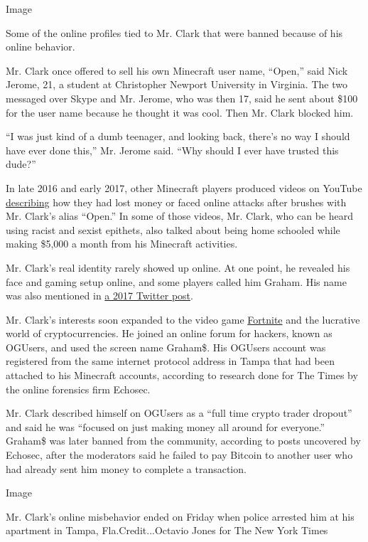 Image

Some of the online profiles tied to Mr. Clark that were banned because
of his online behavior.

Mr. Clark once offered to sell his own Minecraft user name, ``Open,''
said Nick Jerome, 21, a student at Christopher Newport University in
Virginia. The two messaged over Skype and Mr. Jerome, who was then 17,
said he sent about \$100 for the user name because he thought it was
cool. Then Mr. Clark blocked him.

``I was just kind of a dumb teenager, and looking back, there's no way I
should have ever done this,'' Mr. Jerome said. ``Why should I ever have
trusted this dude?''

In late 2016 and early 2017, other Minecraft players produced videos on
YouTube \href{https://www.youtube.com/watch?v=CvrPXbk-BXw}{describing}
how they had lost money or faced online attacks after brushes with Mr.
Clark's alias ``Open.'' In some of those videos, Mr. Clark, who can be
heard using racist and sexist epithets, also talked about being home
schooled while making \$5,000 a month from his Minecraft activities.

Mr. Clark's real identity rarely showed up online. At one point, he
revealed his face and gaming setup online, and some players called him
Graham. His name was also mentioned in
\href{https://twitter.com/opengrahamclark/status/848014008632344576}{a
2017 Twitter post}.

Mr. Clark's interests soon expanded to the video game
\href{https://www.nytimes3xbfgragh.onion/2018/07/25/arts/what-is-fortnite-battle-royale-nyt.html}{Fortnite}
and the lucrative world of cryptocurrencies. He joined an online forum
for hackers, known as OGUsers, and used the screen name Graham\$. His
OGUsers account was registered from the same internet protocol address
in Tampa that had been attached to his Minecraft accounts, according to
research done for The Times by the online forensics firm Echosec.

Mr. Clark described himself on OGUsers as a ``full time crypto trader
dropout'' and said he was ``focused on just making money all around for
everyone.'' Graham\$ was later banned from the community, according to
posts uncovered by Echosec, after the moderators said he failed to pay
Bitcoin to another user who had already sent him money to complete a
transaction.

Image

Mr. Clark's online misbehavior ended on Friday when police arrested him
at his apartment in Tampa, Fla.Credit...Octavio Jones for The New York
Times

